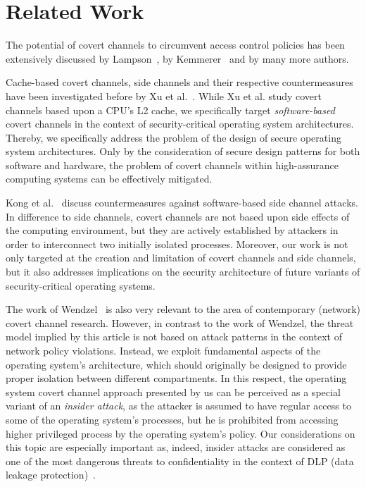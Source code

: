 \documentclass[runningheads,a4paper]{llncs}
\begin{document}
\section{Related Work}\label{sec2}

The potential of covert channels to circumvent access control policies has been extensively discussed by Lampson~\cite{lampson:1973:ncp:362375.362389}, by Kemmerer~\cite{kemmerer:1983:srm:357369.357374} and by many more authors.

Cache-based covert channels, side channels and their respective countermeasures have been investigated before by Xu et al.~\cite{Xu:2011:ELC:2046660.2046670}.
While Xu et al. study covert channels based upon a CPU's L2 cache, we specifically target \emph{software-based} covert channels in the context of security-critical operating system architectures.
Thereby, we specifically address the problem of the design of secure operating system architectures.
Only by the consideration of secure design patterns for both software and hardware, the problem of covert channels within high-assurance computing systems can be effectively mitigated. 

Kong et al.~\cite{10.1109/tc.2012.78} discuss countermeasures against software-based side channel attacks.
In difference to side channels, covert channels are not based upon side effects of the computing environment, but they are actively established by attackers in order to interconnect two initially isolated processes.
Moreover, our work is not only targeted at the creation and limitation of covert channels and side channels, but it also addresses implications on the security architecture of future variants of security-critical operating systems.

The work of Wendzel~\cite{wendzeldiss} is also very relevant to the area of contemporary (network) covert channel research.
However, in contrast to the work of Wendzel, the threat model implied by this article is not based on attack patterns in the context of network policy violations.
Instead, we exploit fundamental aspects of the operating system's architecture, which should originally be designed to provide proper isolation between different compartments.
In this respect, the operating system covert channel approach presented by us can be perceived as a special variant of an \emph{insider attack}, as the attacker is assumed to have regular access to some of the operating system's processes, but he is prohibited from accessing higher privileged process by the operating system's policy.
Our considerations on this topic are especially important as, indeed, insider attacks are considered as one of the most dangerous threats to confidentiality in the context of DLP (data leakage protection)~\cite{Stamati-Koromina:2012:ITC:2371316.2371374}.
\end{document}
